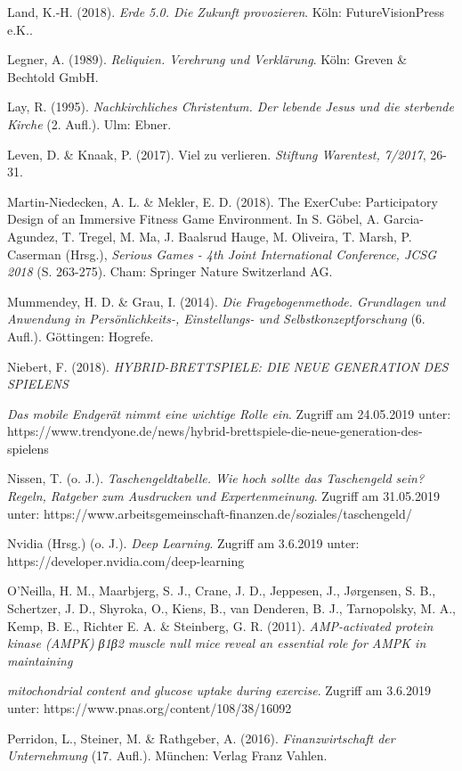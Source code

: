 \documentclass[
  a4paper,
  DIV=11,
  numbers=noendperiod,
  onecolumn,
  oneside,
  a4paper]{scrartcl}
\begin{document}
Land, K.-H. (2018). \emph{Erde 5.0. Die Zukunft provozieren}. Köln:
FutureVisionPress e.K..

Legner, A. (1989). \emph{Reliquien. Verehrung und Verklärung}. Köln:
Greven \& Bechtold GmbH.

Lay, R. (1995). \emph{Nachkirchliches Christentum. Der lebende Jesus und
die sterbende Kirche} (2. Aufl.). Ulm: Ebner.

Leven, D. \& Knaak, P. (2017). Viel zu verlieren. \emph{Stiftung
Warentest, 7/2017}, 26-31.

Martin-Niedecken, A. L. \& Mekler, E. D. (2018). The ExerCube:
Participatory Design of an Immersive Fitness Game Environment. In S.
Göbel, A. Garcia-Agundez, T. Tregel, M. Ma, J. Baalsrud Hauge, M.
Oliveira, T. Marsh, P. Caserman (Hrsg.), \emph{Serious Games - 4th Joint
International Conference, JCSG 2018 }(S. 263-275). Cham: Springer Nature
Switzerland AG.

Mummendey, H. D. \& Grau, I. (2014). \emph{Die Fragebogenmethode.
Grundlagen und Anwendung in Persönlichkeits-, Einstellungs- und
Selbstkonzeptforschung} (6. Aufl.). Göttingen: Hogrefe.

Niebert, F. (2018). \emph{HYBRID-BRETTSPIELE: DIE NEUE GENERATION DES
SPIELENS}

\emph{Das mobile Endgerät nimmt eine wichtige Rolle ein}. Zugriff am
24.05.2019 unter:
https://www.trendyone.de/news/hybrid-brettspiele-die-neue-generation-des-spielens

Nissen, T. (o. J.). \emph{Taschengeldtabelle. Wie hoch sollte das
Taschengeld sein? Regeln, Ratgeber zum Ausdrucken und Expertenmeinung}.
Zugriff am 31.05.2019 unter:
https://www.arbeitsgemeinschaft-finanzen.de/soziales/taschengeld/

Nvidia (Hrsg.) (o. J.). \emph{Deep Learning}. Zugriff am 3.6.2019 unter:
https://developer.nvidia.com/deep-learning

O'Neilla, H. M., Maarbjerg, S. J., Crane, J. D., Jeppesen, J.,
Jørgensen, S. B., Schertzer, J. D., Shyroka, O., Kiens, B., van
Denderen, B. J., Tarnopolsky, M. A., Kemp, B. E., Richter E. A. \&
Steinberg, G. R. (2011). \emph{AMP-activated protein kinase (AMPK) β1β2
muscle null mice reveal an essential role for AMPK in maintaining}

\emph{mitochondrial content and glucose uptake during exercise}. Zugriff
am 3.6.2019 unter: https://www.pnas.org/content/108/38/16092

Perridon, L., Steiner, M. \& Rathgeber, A. (2016).
\emph{Finanzwirtschaft der Unternehmung }(17. Aufl.). München: Verlag
Franz Vahlen.
\end{document}
